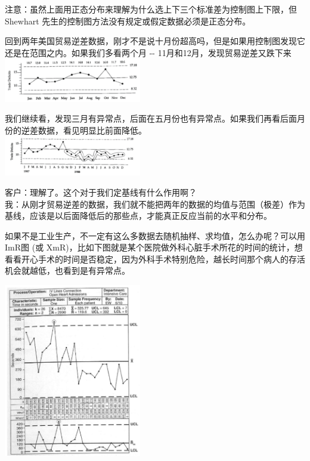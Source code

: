 注意：虽然上面用正态分布来理解为什么选上下三个标准差为控制图上下限，但Shewhart
先生的控制图方法没有规定或假定数据必须是正态分布。

回到两年美国贸易逆差数据，刚才不是说十月份超高吗，但是如果用控制图发现它还是在范围之内。如果我们多看两个月
-\/- 11月和12月，发现贸易逆差又跌下来\\

\includegraphics[width=6cm]{The_key_fig2811.png}

我们继续看，发现三月有异常点，后面在五月份也有异常点。如果我们再看后面月份的逆差数据，看见明显比前面降低。\\

\includegraphics[width=6cm]{The_key_fig21111.png}

客户：理解了。这个对于我们定基线有什么作用啊？\\
我：从刚才贸易逆差的数据，我们就不能把两年的数据的均值与范围（极差）作为基线，应该是以后面降低后的那些点，才能真正反应当前的水平和分布。

如果不是工业生产，不一定有这么多数据去随机抽样、求均值，怎么办呢？可以用ImR图
(或
XmR)，比如下图就是某个医院做外科心脏手术所花的时间的统计，想看看开心手术的时间是否稳定，因为外科手术特别危险，越长时间那个病人的存活机会就越低，也看到是有异常点。


\includegraphics[width=6cm]{控制图081.png}

